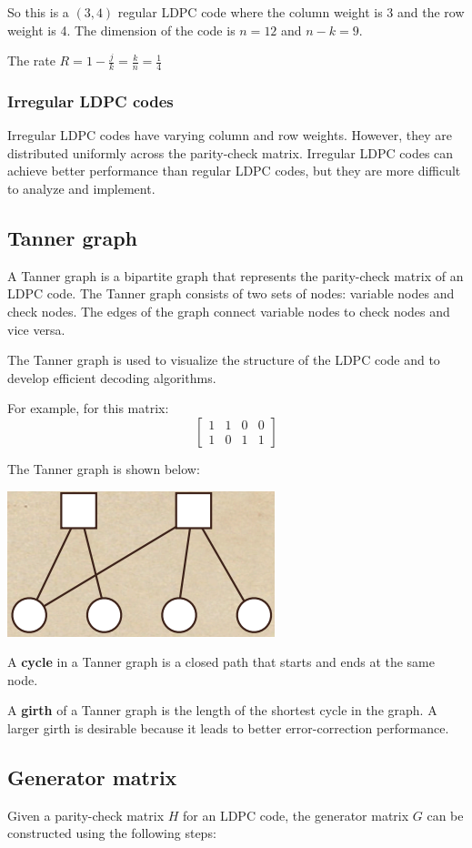 \documentclass[letterpaper,12pt,oneside]{article}
\begin{document}
So this is a $(3,4)$ regular LDPC code where the column weight is 3 and the row weight is 4. The dimension of the code is $n=12$ and $n-k=9$. 

The rate $R=1-\frac{j}{k}=\frac{k}{n}=\frac{1}{4}$
\subsubsection{Irregular LDPC codes}
Irregular LDPC codes have varying column and row weights. However, they are distributed uniformly across the parity-check matrix. Irregular LDPC codes can achieve better performance than regular LDPC codes, but they are more difficult to analyze and implement.
\subsection{Tanner graph}
A Tanner graph is a bipartite graph that represents the parity-check matrix of an LDPC code. The Tanner graph consists of two sets of nodes: variable nodes and check nodes. The edges of the graph connect variable nodes to check nodes and vice versa. 

The Tanner graph is used to visualize the structure of the LDPC code and to develop efficient decoding algorithms.

For example, for this matrix: \[
    \begin{bmatrix}
        1 & 1 & 0 & 0\\
        1 & 0 & 1 & 1
    \end{bmatrix}
\]

The Tanner graph is shown below:

\includegraphics*{./Images/Tanner Graph Example.png}

A \textbf{cycle} in a Tanner graph is a closed path that starts and ends at the same node. 

A \textbf{girth} of a Tanner graph is the length of the shortest cycle in the graph. A larger girth is desirable because it leads to better error-correction performance.
\subsection{Generator matrix}
Given a parity-check matrix $H$ for an LDPC code, the generator matrix $G$ can be constructed using the following steps:
\end{document}
